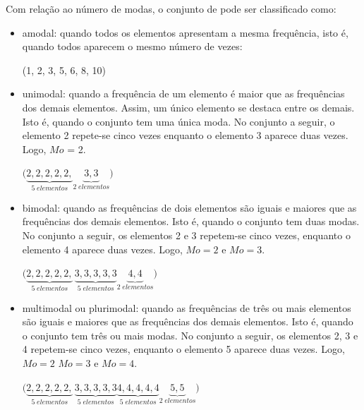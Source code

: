 Com relação ao número de modas, o conjunto de pode ser classificado como:

\begin{itemize}
    \item amodal: quando todos os elementos apresentam a mesma frequência, isto é, quando todos aparecem o mesmo número de vezes:
    
    \begin{center}
    (1, 2, 3, 5, 6, 8, 10)
    \end{center}

\item unimodal: quando a frequência de um elemento é maior que as frequências dos demais elementos. Assim, um único elemento se destaca entre os demais. Isto é, quando o conjunto tem uma única moda. No conjunto a seguir, o elemento 2 repete-se cinco vezes enquanto o elemento 3 aparece duas vezes. Logo, $Mo$ = 2.

    \begin{center}
    $\Bigg
    (\underbrace{2, 2, 2, 2, 2,}_{5\; elementos} 
    \underbrace{3,3}_{2\; elementos}\Bigg)$
    \end{center}

\item bimodal: quando as frequências de dois elementos são iguais e maiores que as frequências dos demais elementos. Isto é, quando o conjunto tem duas modas. No conjunto a seguir, os elementos 2 e 3 repetem-se cinco vezes, enquanto o elemento 4 aparece duas vezes. Logo, $Mo = 2$ e $Mo=3$.

    \begin{center}
    $\Bigg(\underbrace{2, 2, 2, 2, 2,}_{5\; elementos}\, \underbrace{3, 3, 3, 3, 3}_{5\; elementos}
    \underbrace{4, 4}_{2\; elementos}\Bigg)$
    \end{center}

\item multimodal ou plurimodal: quando as frequências de três ou mais elementos são iguais e maiores que as frequências dos demais elementos. Isto é, quando o conjunto tem três ou mais modas. No conjunto a seguir, os elementos 2, 3 e 4 repetem-se cinco vezes, enquanto o elemento 5 aparece duas vezes. Logo, $Mo = 2$  $Mo=3$ e $Mo=4$.

    \begin{center}
    $\Bigg(\underbrace{2, 2, 2, 2, 2,}_{5\; elementos}\, \underbrace{3, 3, 3, 3, 3}_{5\; elementos}
    \underbrace{4, 4, 4, 4, 4}_{5\; elementos}
    \underbrace{5, 5}_{2\; elementos}\Bigg)$
    \end{center}
\end{itemize}

